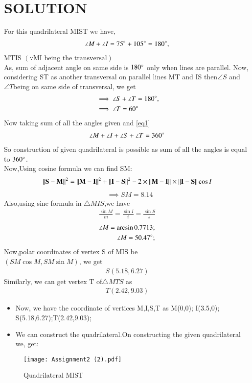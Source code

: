 \documentclass[journal,12pt,twocolumn]{IEEEtran}
\begin{document}
\section{SOLUTION}
For this quadrilateral MIST we have,
\begin{align}
\angle M +\angle I = 75\degree + 105\degree =180\degree,
\end{align}
\implies MT\parallel IS $ (\because \text {MI being the transversal})$
\\
As, sum of adjacent angle on same side is $180\degree$ only when lines are parallel.
Now, considering ST as another transversal on parallel lines MT and IS then$\angle S$ and $\angle T $being on same side of transversal, we get
\begin{align}
&\implies \angle S + \angle T = 180\degree,
\\
&\implies \angle T = 60\degree\label{eq1}
\end{align}
Now taking sum of all the angles given and \eqref{eq1}  
\begin{align}
\angle M + \angle I +\angle S +\angle T =360\degree
\end{align}
So construction of given quadrilateral is possible as sum of all the angles is equal to $360\degree$.
\\
Now,Using cosine formula we can find SM:
\begin{multline}
{\Vert\mathbf{S}-\mathbf{M}\rVert^2}= {\Vert\mathbf{M}-\mathbf{I}\rVert^2}+ \Vert\mathbf{I}-\mathbf{S}\rVert^2-2\times\Vert\mathbf{M}-\mathbf{I}\rVert \times \Vert\mathbf{I}-\mathbf{S}\rVert\cos{I}
\end{multline}
\begin{align}
&\implies SM=8.14
\end{align}
Also,using sine formula in $\triangle MIS$,we have
\begin{align}
\frac{{\sin M}}{m} = \frac{{\sin I}}{i} = \frac{{\sin S}}{s}
\end{align}
\begin{align}
\angle M=\arcsin 0.7713;
\\
\angle M= 50.47 \degree ;
\end{align}
Now,polar coordinates of vertex S of \triangle MIS be
\\$(SM \cos M,SM\sin M)$, we get
\begin{align}
S(5.18,6.27)
\end{align}
Similarly, we can get vertex T of$ \triangle MTS$ as
\begin{align}
T(2.42,9.03)
\end{align}
\begin{itemize}
    \item Now, we have the coordinate of vertices M,I,S,T as M(0,0); I(3.5,0); S(5.18,6.27);T(2.42,9.03);
    \item We can construct the quadrilateral.On constructing the given  quadrilateral we, get:
\end{itemize}
\begin{figure}[!ht]
\centering
\texttt{[image: Assignment2 (2).pdf]}
\caption{Quadrilateral MIST}
\label{fig:Quadrilateral MIST}	
\end{figure}
\end{document}

